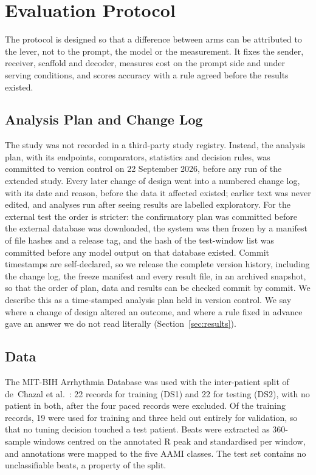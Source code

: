 \section{Evaluation Protocol}
\label{sec:protocol}

The protocol is designed so that a difference between arms can be attributed to the lever, not to the prompt, the model or the measurement. It fixes the sender, receiver, scaffold and decoder, measures cost on the prompt side and under serving conditions, and scores accuracy with a rule agreed before the results existed.

\subsection{Analysis Plan and Change Log}
The study was not recorded in a third-party study registry. Instead, the analysis plan, with its endpoints, comparators, statistics and decision rules, was committed to version control on 22 September 2026, before any run of the extended study. Every later change of design went into a numbered change log, with its date and reason, before the data it affected existed; earlier text was never edited, and analyses run after seeing results are labelled exploratory. For the external test the order is stricter: the confirmatory plan was committed before the external database was downloaded, the system was then frozen by a manifest of file hashes and a release tag, and the hash of the test-window list was committed before any model output on that database existed. Commit timestamps are self-declared, so we release the complete version history, including the change log, the freeze manifest and every result file, in an archived snapshot, so that the order of plan, data and results can be checked commit by commit. We describe this as a time-stamped analysis plan held in version control. We say where a change of design altered an outcome, and where a rule fixed in advance gave an answer we do not read literally (Section~\ref{sec:results}).

\subsection{Data}
 The MIT-BIH Arrhythmia Database \cite{moody2001impact} was used with the inter-patient split of de~Chazal et al.\ \cite{dechazal2004automatic}: 22 records for training (DS1) and 22 for testing (DS2), with no patient in both, after the four paced records were excluded. Of the training records, 19 were used for training and three held out entirely for validation, so that no tuning decision touched a test patient. Beats were extracted as 360-sample windows centred on the annotated R peak and standardised per window, and annotations were mapped to the five AAMI classes. The test set contains no unclassifiable beats, a property of the split.

